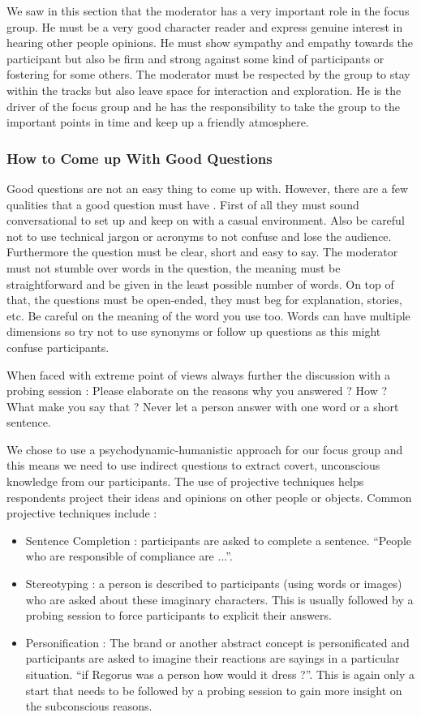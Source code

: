 \documentclass[10pt]{report}
\begin{document}
We saw in this section that the moderator has a very important role in the focus group. He must be a very good character reader and express genuine interest in hearing other people opinions. He must show sympathy and empathy towards the participant but also be firm and strong against some kind of participants or fostering for some others. The moderator must be respected by the group to stay within the tracks but also leave space for interaction and exploration. He is the driver of the focus group and he has the responsibility to take the group to the important points in time and keep up a friendly atmosphere.

\subsubsection{How to Come up With Good Questions}

Good questions are not an easy thing to come up with. However, there are a few qualities that a good question must have \autocite{Krueger2000}. First of all they must sound conversational to set up and keep on with a casual environment. Also be careful not to use technical jargon or acronyms to not confuse and lose the audience. Furthermore the question must be clear, short and easy to say. The moderator must not stumble over words in the question, the meaning must be straightforward and be given in the least possible number of words. On top of that, the questions must be open-ended, they must beg for explanation, stories, etc. Be careful on the meaning of the word you use too. Words can have multiple dimensions so try not to use synonyms or follow up questions as this might confuse participants.

When faced with extreme point of views always further the discussion with a probing session : Please elaborate on the reasons why you answered ? How ? What make you say that ? Never let a person answer with one word or a short sentence. 

We chose to use a psychodynamic-humanistic approach for our focus group and this means we need to use indirect questions to extract covert, unconscious knowledge from our participants. The use of projective techniques helps respondents project their ideas and opinions on other people or objects. Common projective techniques include : 
\begin{itemize}
\item Sentence Completion : participants are asked to complete a sentence. \enquote{People who are responsible of compliance are ...}.
\item Stereotyping : a person is described to participants (using words or images) who are asked about these imaginary characters. This is usually followed by a probing session to force participants to explicit their answers.
\item Personification : The brand or another abstract concept is personificated and participants are asked to imagine their reactions are sayings in a particular situation. \enquote{if Regorus was a person how would it dress ?}. This is again only a start that needs to be followed by a probing session to gain more insight on the subconscious reasons.
\end{itemize}
\end{document}
